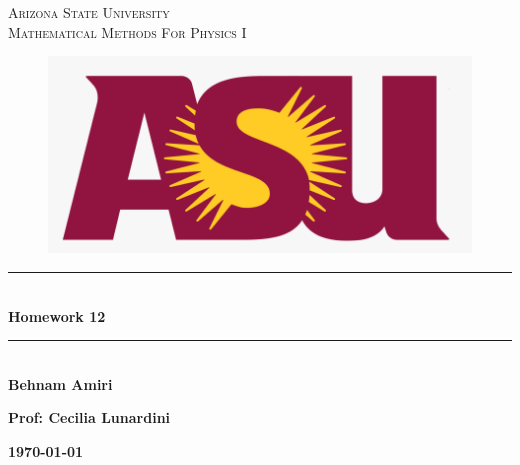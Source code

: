 \documentclass[fleqn]{article}
\begin{document}
  \begin{titlepage}

    \newcommand{\HRule}{\rule{\linewidth}{0.5mm}}

    \center
    


    \textsc{\LARGE Arizona State University}\\[1.5cm]

    \textsc{\LARGE Mathematical Methods For Physics I }\\[1.5cm]


    \begin{figure}
      \includegraphics[width=\linewidth]{asu.png}
    \end{figure}


    \HRule \\[0.4cm]
    { \huge \bfseries Homework 12}\\[0.4cm] 
    \HRule \\[1.5cm]
    
    \textbf{Behnam Amiri}

    \bigbreak

    \textbf{Prof: Cecilia Lunardini}

    \bigbreak


    \textbf{{\large \today}\\[2cm]}

    \vfill

  \end{titlepage}
\end{document}
